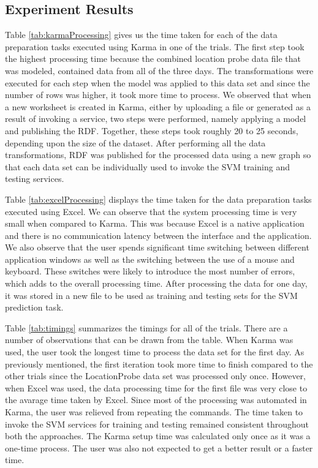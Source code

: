 \subsection{Experiment Results}
Table \ref{tab:karmaProcessing} gives us the time taken for each of the data preparation tasks executed using Karma in one of the trials. The first step took the highest processing time because the combined location probe data file that was modeled, contained data from all of the three days. The transformations were executed for each step when the model was applied to this data set and since the number of rows was higher, it took more time to process. We observed that when a new worksheet is created in Karma, either by uploading a file or generated as a result of invoking a service, two steps were performed, namely applying a model and publishing the RDF. Together, these steps took roughly 20 to 25 seconds, depending upon the size of the dataset. After performing all the data transformations, RDF was published for the processed data using a new graph so that each data set can be individually used to invoke the SVM training and testing services. 

Table \ref{tab:excelProcessing} displays the time taken for the data preparation tasks executed using Excel. We can observe that the system processing time is very small when compared to Karma. This was because Excel is a native application and there is no communication latency between the interface and the application. We also observe that the user spends significant time switching between different application windows as well as the switching between the use of a mouse and keyboard. These switches were likely to introduce the most number of errors, which adds to the overall processing time. After processing the data for one day, it was stored in a new file to be used as training and testing sets for the SVM prediction task.

Table \ref{tab:timings} summarizes the timings for all of the trials. There are a number of observations that can be drawn from the table. When Karma was used, the user took the longest time to process the data set for the first day. As previously mentioned, the first iteration took more time to finish compared to the other trials since the LocationProbe data set was processed only once. However, when Excel was used, the data processing time for the first file was very close to the avarage time taken by Excel. Since most of the processing was automated in Karma, the user was relieved from repeating the commands. The time taken to invoke the SVM services for training and testing remained consistent throughout both the approaches. The Karma setup time was calculated only once as it was a one-time process. The user was also not expected to get a better result or a faster time. 

